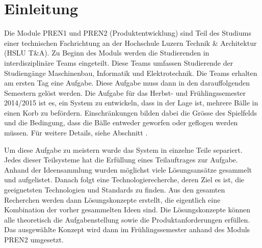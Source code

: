 \section{Einleitung}
Die Module PREN1 und PREN2 (Produktentwicklung) sind Teil des Studiums einer 
technischen Fachrichtung an der Hochschule Luzern Technik \& Architektur 
(HSLU T\&A). 
Zu Beginn des Moduls werden die Studierenden in interdisziplinäre Teams 
eingeteilt. Diese Teams umfassen Studierende der Studiengänge Maschinenbau, 
Informatik und Elektrotechnik. Die Teams erhalten am ersten Tag eine Aufgabe. 
Diese Aufgabe muss dann in den darauffolgenden Semestern gelöst werden. 
Die Aufgabe für das Herbst- und Frühlingssemester 2014/2015 ist es, ein System zu entwickeln, dass in der Lage ist, mehrere Bälle in einen Korb zu befördern. Einschränkungen bilden dabei die Grösse des Spielfelds und die Bedingung, dass die Bälle entweder geworfen oder geflogen werden müssen. 
Für weitere Details, siehe Abschnitt . 

Um diese Aufgabe zu meistern wurde das System in einzelne Teile separiert. Jedes dieser Teilsysteme hat die Erfüllung eines Teilauftrages zur Aufgabe. Anhand der Ideensammlung wurden möglichst viele Lösungsansätze gesammelt und aufgelistet. Danach folgt eine Technologierecherche, deren Ziel es ist, die geeignetsten Technologien und Standards zu finden. Aus den gesamten Recherchen werden dann Lösungskonzepte erstellt, die eigentlich eine Kombination der vorher gesammelten Ideen sind. Die Lösungskonzepte können alle theoretisch die Aufgabenstellung sowie die Produktanforderungen erfüllen. Das ausgewählte Konzept wird dann im Frühlingssemester anhand des Moduls PREN2 umgesetzt.